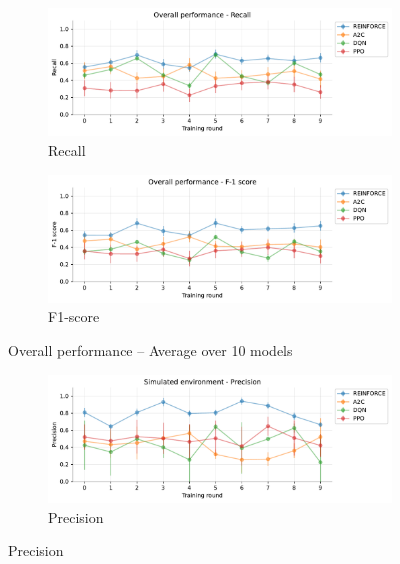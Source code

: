 \documentclass[a4paper, 12pt]{article}
\begin{document}
\begin{appendices}
\begin{figure}[h]
	\begin{subfigure}{\textwidth}
		\centering
		\includegraphics[width=\linewidth]{Overall_Rc.pdf}  
		\caption{Recall}
		\label{fig:tr-ovr-rc}
	\end{subfigure} \par\smallskip
	
	\begin{subfigure}{\textwidth}
		\centering
		\includegraphics[width=\linewidth]{Overall_F1.pdf}  
		\caption{F1-score}
		\label{fig:tr-ovr-f1}
	\end{subfigure}
	\caption{Overall performance -- Average over 10 models}
	\label{fig:tr-overall}
\end{figure}

\begin{figure}[h]
	\begin{subfigure}{\textwidth}
		\centering
		\includegraphics[width=\linewidth]{Simulated_Pr.pdf}  
		\caption{Precision}
		\label{fig:tr-sim-pr}
	\end{subfigure} \par\smallskip
	

\end{figure}
\end{appendices}
\end{document}
